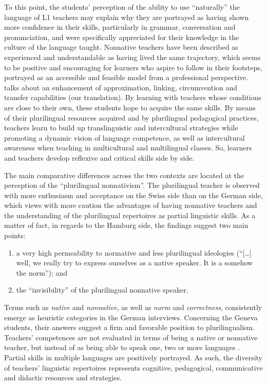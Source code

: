 \documentclass[output=paper]{../langscibook}
\begin{document}
To this point, the students’ perception of the ability to use “naturally” the language of L1 teachers may explain why they are portrayed as having shown more confidence in their skills, particularly in grammar, conversation and pronunciation, and were specifically appreciated for their knowledge in the culture of the language taught. Nonnative teachers have been described as experienced and understandable as having lived the same trajectory, which seems to be positive and encouraging for learners who aspire to follow in their footsteps, portrayed as an accessible and feasible model from a professional perspective. \citet[46]{Castellotti2011} talks about an enhancement of approximation, linking, circumvention and transfer capabilities (our translation). By learning with teachers whose conditions are close to their own, these students hope to acquire the same skills. By means of their plurilingual resources acquired and by plurilingual pedagogical practices, teachers learn to build up translinguistic and intercultural strategies while promoting a dynamic vision of language competence, as well as intercultural awareness when teaching in multicultural and multilingual classes. So, learners and teachers develop reflexive and critical skills side by side.

The main comparative differences across the two contexts are located at the perception of the “plurilingual nonnativism”. The plurilingual teacher is observed with more enthusiasm and acceptance on the Swiss side than on the German side, which views with more caution the advantages of having nonnative teachers and the understanding of the plurilingual repertoires as partial linguistic skills. As a matter of fact, in regards to the Hamburg side, the findings suggest two main points: 

\begin{enumerate}
\item a very high permeability to normative and less plurilingual ideologies (“[…] well, we really try to express ourselves as a native speaker. It is a somehow the norm”); and 
\item the “invisibility” of the plurilingual nonnative speaker. 
\end{enumerate}

\noindent Terms such as \emph{native} and \emph{nonnative}, as well as \emph{norm} and \emph{correctness}, consistently emerge as heuristic categories in the German interviews. Concerning the Geneva students, their answers suggest a firm and favorable position to plurilingualism. Teachers’ competences are not evaluated in terms of being a native or nonnative teacher, but instead of as being able to speak one, two or more languages \citep{Bento2011}. Partial skills in multiple languages are positively portrayed. As such, the diversity of teachers’ linguistic repertoires represents cognitive, pedagogical, communicative and didactic resources and strategies.
\end{document}
